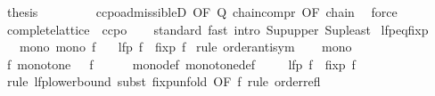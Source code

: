 \begin{isabellebody}
\ {\isacharquery}{\kern0pt}thesis\ \isanewline
\ \ \ \ \ \ \isamarkupfalse%
\ ccpo{\isachardot}{\kern0pt}admissibleD\ {\isacharbrackleft}{\kern0pt}OF\ Q\ chain{\isacharunderscore}{\kern0pt}compr\ {\isacharbrackleft}{\kern0pt}OF\ chain{\isacharbrackright}{\kern0pt}{\isacharbrackright}{\kern0pt}\ \isamarkupfalse%
\ force\isanewline
\ \ \isamarkupfalse%
\isanewline
{}\isamarkupfalse%
%
\endisatagproof
{\isafoldproof}%
%
\isadelimproof
\isanewline
%
\endisadelimproof
\isanewline
{}\isamarkupfalse%
\isanewline
\isanewline
{}\isamarkupfalse%
\ complete{\isacharunderscore}{\kern0pt}lattice\ {\isasymsubseteq}\ ccpo\isanewline
%
\isadelimproof
\ \ %
\endisadelimproof
%
\isatagproof
{}\isamarkupfalse%
\ standard\ {\isacharparenleft}{\kern0pt}fast\ intro{\isacharcolon}{\kern0pt}\ Sup{\isacharunderscore}{\kern0pt}upper\ Sup{\isacharunderscore}{\kern0pt}least{\isacharparenright}{\kern0pt}{\isacharplus}{\kern0pt}%
\endisatagproof
{\isafoldproof}%
%
\isadelimproof
\isanewline
%
\endisadelimproof
\isanewline
{}\isamarkupfalse%
\ lfp{\isacharunderscore}{\kern0pt}eq{\isacharunderscore}{\kern0pt}fixp{\isacharcolon}{\kern0pt}\isanewline
\ \ \ mono{\isacharcolon}{\kern0pt}\ {\isachardoublequoteopen}mono\ f{\isachardoublequoteclose}\isanewline
\ \ \ {\isachardoublequoteopen}lfp\ f\ {\isacharequal}{\kern0pt}\ fixp\ f{\isachardoublequoteclose}\isanewline
%
\isadelimproof
%
\endisadelimproof
%
\isatagproof
{}\isamarkupfalse%
\ {\isacharparenleft}{\kern0pt}rule\ order{\isachardot}{\kern0pt}antisym{\isacharparenright}{\kern0pt}\isanewline
\ \ \isamarkupfalse%
\ mono\ \isamarkupfalse%
\ f{\isacharprime}{\kern0pt}{\isacharcolon}{\kern0pt}\ {\isachardoublequoteopen}monotone\ {\isacharparenleft}{\kern0pt}{\isasymle}{\isacharparenright}{\kern0pt}\ {\isacharparenleft}{\kern0pt}{\isasymle}{\isacharparenright}{\kern0pt}\ f{\isachardoublequoteclose}\isanewline
\ \ \ \ \isamarkupfalse%
\ mono{\isacharunderscore}{\kern0pt}def\ monotone{\isacharunderscore}{\kern0pt}def\ \isacommand{{\isachardot}{\kern0pt}}\isamarkupfalse%
\isanewline
\ \ \isamarkupfalse%
\ {\isachardoublequoteopen}lfp\ f\ {\isasymle}\ fixp\ f{\isachardoublequoteclose}\isanewline
\ \ \ \ \isamarkupfalse%
\ {\isacharparenleft}{\kern0pt}rule\ lfp{\isacharunderscore}{\kern0pt}lowerbound{\isacharcomma}{\kern0pt}\ subst\ fixp{\isacharunderscore}{\kern0pt}unfold\ {\isacharbrackleft}{\kern0pt}OF\ f{\isacharprime}{\kern0pt}{\isacharbrackright}{\kern0pt}{\isacharcomma}{\kern0pt}\ rule\ order{\isacharunderscore}{\kern0pt}refl{\isacharparenright}{\kern0pt}\isanewline

\end{isabellebody}
